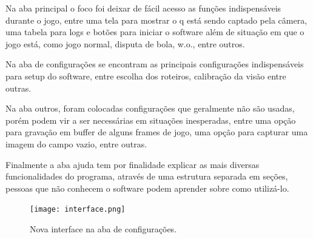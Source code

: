 Na aba principal o foco foi deixar de fácil acesso as funções indispensáveis durante o jogo, entre uma tela para mostrar o q está sendo captado pela câmera, uma tabela para logs e botões para iniciar o software além de situação em que o jogo está, como jogo normal, disputa de bola, w.o., entre outros.

Na aba de configurações se encontram as principais configurações indispensáveis para setup do software, entre escolha dos roteiros, calibração da visão entre outras.

Na aba outros, foram colocadas configurações que geralmente não são usadas, porém podem vir a ser necessárias em situações inesperadas, entre uma opção para gravação em buffer de alguns frames de jogo, uma opção para capturar uma imagem do campo vazio, entre outras.

Finalmente a aba ajuda tem por finalidade explicar as mais diversas funcionalidades do programa, através de uma estrutura separada em seções, pessoas que não conhecem o software podem aprender sobre como utilizá-lo.

\begin{figure}[!htb]
    \centering
        \texttt{[image: interface.png]}
        \caption{Nova interface na aba de configurações.}
    \label{fig:interface}
\end{figure}
